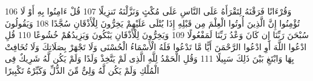 \documentclass[20pt,a4paper]{article}
\begin{document}
{\tiny\colorbox{cl_aya}{106}} وَقُرْءَانًا فَرَقْنَهُ لِتَقْرَأَهُ عَلَى النَّاسِ عَلَى مُكْثٍ وَنَزَّلْنَهُ تَنزِيلًا
{\tiny\colorbox{cl_aya}{107}} قُلْ ءَامِنُوا بِهِ أَوْ لَا تُؤْمِنُوا إِنَّ الَّذِينَ أُوتُوا الْعِلْمَ مِن قَبْلِهِ إِذَا يُتْلَى عَلَيْهِمْ يَخِرُّونَ لِلْأَذْقَانِ سُجَّدًا
{\tiny\colorbox{cl_aya}{108}} وَيَقُولُونَ سُبْحَنَ رَبِّنَا إِن كَانَ وَعْدُ رَبِّنَا لَمَفْعُولًا
{\tiny\colorbox{cl_aya}{109}} وَيَخِرُّونَ لِلْأَذْقَانِ يَبْكُونَ وَيَزِيدُهُمْ خُشُوعًا
{\tiny\colorbox{cl_aya}{110}} قُلِ ادْعُوا اللَّهَ أَوِ ادْعُوا الرَّحْمَنَ أَيًّا مَّا تَدْعُوا فَلَهُ الْأَسْمَاءُ الْحُسْنَى وَلَا تَجْهَرْ بِصَلَاتِكَ وَلَا تُخَافِتْ بِهَا وَابْتَغِ بَيْنَ ذَلِكَ سَبِيلًا
{\tiny\colorbox{cl_aya}{111}} وَقُلِ الْحَمْدُ لِلَّهِ الَّذِى لَمْ يَتَّخِذْ وَلَدًا وَلَمْ يَكُن لَّهُ شَرِيكٌ فِى الْمُلْكِ وَلَمْ يَكُن لَّهُ وَلِىٌّ مِّنَ الذُّلِّ وَكَبِّرْهُ تَكْبِيرًا
\end{document}
